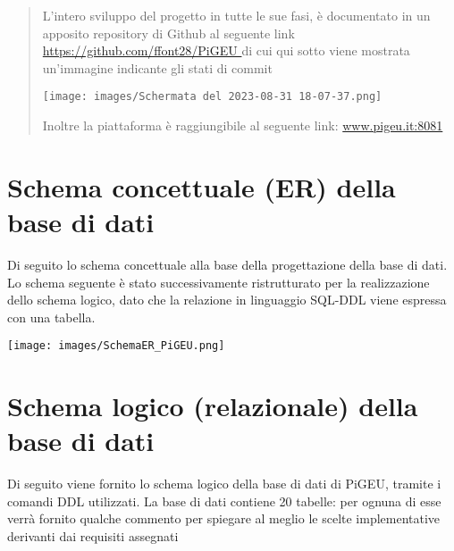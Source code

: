 \documentclass{article}
\begin{document}
\begin{abstract}
        \pagebreak

        L'intero sviluppo del progetto in tutte le sue fasi, è documentato in un apposito repository di Github al seguente link \url{https://github.com/ffont28/PiGEU } di cui qui sotto viene mostrata un'immagine indicante gli stati di commit
        \begin{center}
            \texttt{[image: images/Schermata del 2023-08-31 18-07-37.png]}
        \end{center}


        Inoltre la piattaforma è raggiungibile al seguente link: \url{www.pigeu.it:8081}
    \end{abstract}

    \pagebreak

    \tableofcontents

    \pagebreak

    \section{Schema concettuale (ER) della base di dati}
    Di seguito lo schema concettuale alla base della progettazione della base di dati.
    Lo schema seguente è stato successivamente ristrutturato per la realizzazione dello schema logico, dato che la relazione in linguaggio SQL-DDL viene espressa con una tabella.


    \texttt{[image: images/SchemaER\_PiGEU.png]}

    \pagebreak

    \section{Schema logico (relazionale) della base di dati}
    Di seguito viene fornito lo schema logico della base di dati di PiGEU, tramite i comandi DDL utilizzati. La base di dati contiene 20 tabelle: per ognuna di esse verrà fornito qualche commento per spiegare al meglio le scelte implementative derivanti dai requisiti assegnati

\end{document}
